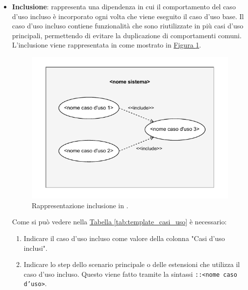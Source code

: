 \begin{itemize}
\begin{itemize}
        \item \textbf{Inclusione}: rappresenta una dipendenza in cui il comportamento del caso d'uso incluso è incorporato ogni volta che viene eseguito il caso d'uso base. Il caso d'uso incluso contiene funzionalità che sono riutilizzate in più casi d'uso principali, permettendo di evitare la duplicazione di comportamenti comuni.
        L'inclusione viene rappresentata in  come mostrato in \hyperref[fig:inclusione_uml]{Figura \ref{fig:inclusione_uml}}.
        \begin{figure}[H]
            \centering
            \includegraphics{Sezioni/ProcessiPrimari/Immagini/inclusione_uml.pdf}
            \caption{Rappresentazione inclusione in .}
            \label{fig:inclusione_uml}
        \end{figure}
        Come si può vedere nella \hyperref[tab:template_casi_uso]{Tabella \ref{tab:template_casi_uso}} è necessario:
        \begin{enumerate}
            \item Indicare il caso d'uso incluso come valore della colonna "Casi d'uso inclusi".
            \item Indicare lo step dello scenario principale o delle estensioni che utilizza il caso d'uso incluso.
            Questo viene fatto tramite la sintassi \texttt{::<nome caso d'uso>}.
        \end{enumerate} 


\end{itemize}
\end{itemize}
